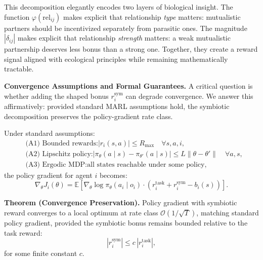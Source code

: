 \documentclass[Afour,sageh,times]{sagej}
\begin{document}
This decomposition elegantly encodes two layers of biological insight. The function $\varphi(\mathrm{rel}_{ij})$ makes explicit that relationship \emph{type} matters: mutualistic partners should be incentivized separately from parasitic ones. The magnitude $|\delta_{ij}|$ makes explicit that relationship \emph{strength} matters: a weak mutualistic partnership deserves less bonus than a strong one. Together, they create a reward signal aligned with ecological principles while remaining mathematically tractable.

\textbf{Convergence Assumptions and Formal Guarantees.} A critical question is whether adding the shaped bonus $r_i^{\mathrm{sym}}$ can degrade convergence. We answer this affirmatively: provided standard MARL assumptions hold, the symbiotic decomposition preserves the policy-gradient rate class.

Under standard assumptions:
\begin{align}
&\text{(A1) Bounded rewards:} |r_i(s, a)| \le R_{\max} \quad \forall s, a, i, \\
&\text{(A2) Lipschitz policy:} |\pi_\theta(a\mid s) - \pi_{\theta'}(a\mid s)| \le L\|\theta-\theta'\| \quad \forall a, s, \\
&\text{(A3) Ergodic MDP:} \text{all states reachable under some policy,}
\end{align}
the policy gradient for agent $i$ becomes:
\begin{equation}
\nabla_\theta J_i(\theta)
= \mathbb{E}\!\left[\nabla_\theta \log \pi_\theta(a_i\mid o_i)
\cdot \left(r_i^{\mathrm{task}} + r_i^{\mathrm{sym}} - b_i(s)\right)\right].
\label{eq:c2_pg}
\end{equation}

\textbf{Theorem (Convergence Preservation).} Policy gradient with symbiotic reward converges to a local optimum at rate class $\mathcal{O}(1/\sqrt{T})$, matching standard policy gradient, provided the symbiotic bonus remains bounded relative to the task reward:
\begin{equation}
|r_i^{\mathrm{sym}}| \le c\,|r_i^{\mathrm{task}}|,
\end{equation}
for some finite constant $c$.
\end{document}
